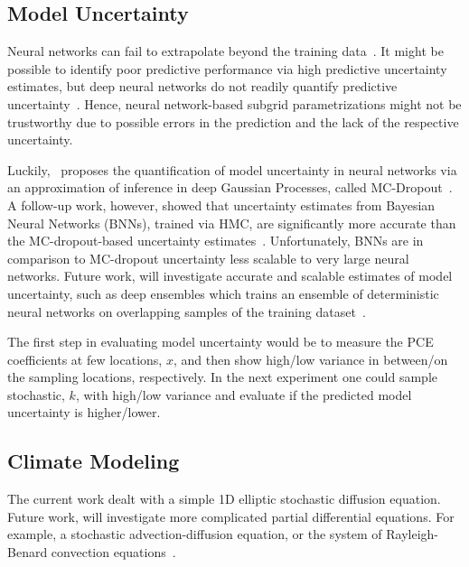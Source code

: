 \documentclass[letterpaper, 10 pt, conference, twocolumn]{ieeeconf}  %
\begin{document}



\subsection{Model Uncertainty}
Neural networks can fail to extrapolate beyond the training data~\cite{Amodei_2016}. It might be possible to identify poor predictive performance via high predictive uncertainty estimates, but deep neural networks do not readily quantify predictive uncertainty~\cite{Amodei_2016,Gal_2016b}. Hence, neural network-based subgrid parametrizations might not be trustworthy due to possible errors in the prediction and the lack of the respective uncertainty. 

Luckily,~\cite{Zhang_2019} proposes the quantification of model uncertainty in neural networks via an approximation of inference in deep Gaussian Processes, called MC-Dropout~\cite{Gal_2016}. A follow-up work, however, showed that uncertainty estimates from Bayesian Neural Networks (BNNs), trained via HMC, are significantly more accurate than the MC-dropout-based uncertainty estimates~\cite{Yanga_2021}. Unfortunately, BNNs are in comparison to MC-dropout uncertainty less scalable to very large neural networks. Future work, will investigate accurate and scalable estimates of model uncertainty, such as deep ensembles which trains an ensemble of deterministic neural networks on overlapping samples of the training dataset~\cite{Lakshinarayanan_2017}. 

The first step in evaluating model uncertainty would be to measure the PCE coefficients at few locations, $x$, and then show high/low variance in between/on the sampling locations, respectively. In the next experiment one could sample stochastic, $k$, with high/low variance and evaluate if the predicted model uncertainty is higher/lower. 

\subsection{Climate Modeling}
The current work dealt with a simple 1D elliptic stochastic diffusion equation. Future work, will investigate more complicated partial differential equations. For example, a stochastic advection-diffusion equation, or the system of Rayleigh-Benard convection equations~\cite{Emanuel_1995}. 
\end{document}
